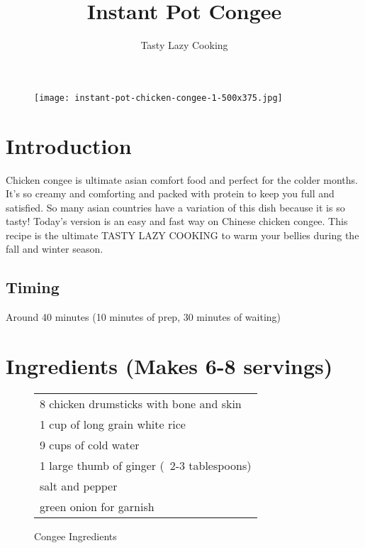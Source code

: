 \documentclass{article}
\title{Instant Pot Congee}
\author{Tasty Lazy Cooking}
\begin{document}
\maketitle

\begin{figure}[H]
    \centering
    \texttt{[image: instant-pot-chicken-congee-1-500x375.jpg]}
\end{figure}

\section{Introduction}

Chicken congee is ultimate asian comfort food and perfect for the colder months. It's so creamy and comforting and packed with protein to keep you full and satisfied. So many asian countries have a variation of this dish because it is so tasty! Today's version is an easy and fast way on Chinese chicken congee. This recipe is the ultimate TASTY LAZY COOKING to warm your bellies during the fall and winter season. 

\subsection{Timing}
Around 40 minutes (10 minutes of prep, 30 minutes of waiting)

\section{Ingredients (Makes 6-8 servings)}
\begin{figure}[H]
\centering
\caption{Congee Ingredients}
\begin{tabular}[t]{l}
\toprule
8 chicken drumsticks with bone and skin \\
1 cup of long grain white rice \\ 
9 cups of cold water \\ 
1 large thumb of ginger (~2-3 tablespoons) \\ 
salt and pepper \\ 
green onion for garnish \\ 
\bottomrule
\end{tabular}
\end{figure}
\end{document}
